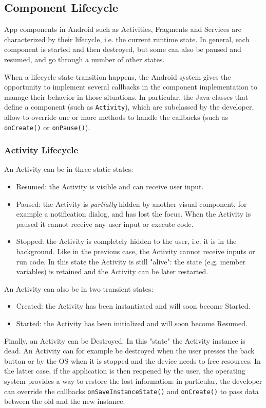 \documentclass[11pt,a4paper,notitlepage]{article}
\begin{document}
\subsection{Component Lifecycle}
App components in Android such as Activities, Fragments and Services are characterized by their lifecycle, i.e. the current runtime state. In general, each component is started and then destroyed, but some can also be paused and resumed, and go through a number of other states.

When a lifecycle state transition happens, the Android system gives the opportunity to implement several callbacks in the component implementation to manage their behavior in those situations. In particular, the Java classes that define a component (such as \texttt{Activity}), which are subclassed by the developer, allow to override one or more methods to handle the callbacks (such as \texttt{onCreate()} or \texttt{onPause()}).

\subsubsection{Activity Lifecycle}
An Activity can be in three static states:
\begin{itemize}
	\item Resumed: the Activity is visible and can receive user input.
	\item Paused: the Activity is \textit{partially} hidden by another visual component, for example a notification dialog, and has lost the focus. When the Activity is paused it cannot receive any user input or execute code.
	\item Stopped: the Activity is completely hidden to the user, i.e. it is in the background. Like in the previous case, the Activity cannot receive inputs or run code. In this state the Activity is still "alive": the state (e.g. member variables) is retained and the Activity can be later restarted.
\end{itemize}

An Activity can also be in two transient states:
\begin{itemize}
	\item Created: the Activity has been instantiated and will soon become Started.
	\item Started: the Activity has been initialized and will soon become Resumed.
\end{itemize}

Finally, an Activity can be Destroyed. In this "state" the Activity instance is dead. An Activity can for example be destroyed when the user presses the back button or by the OS when it is stopped and the device needs to free resources. In the latter case, if the application is then reopened by the user, the operating system provides a way to restore the lost information: in particular, the developer can override the callbacks \texttt{onSaveInstanceState()} and \texttt{onCreate()} to pass data between the old and the new instance.
\end{document}
